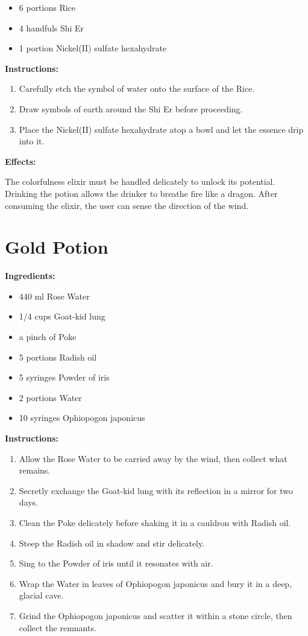 \documentclass{article}
\begin{document}
\begin{itemize}
  \item 6 portions Rice
  \item 4 handfuls Shi Er
  \item 1 portion Nickel(II) sulfate hexahydrate
\end{itemize}

\textbf{Instructions:}

\begin{enumerate}
  \item Carefully etch the symbol of water onto the surface of the Rice.
  \item Draw symbols of earth around the Shi Er before proceeding.
  \item Place the Nickel(II) sulfate hexahydrate atop a bowl and let the essence drip into it.
\end{enumerate}

\textbf{Effects:}

The colorfulness elixir must be handled delicately to unlock its potential. Drinking the potion allows the drinker to breathe fire like a dragon. After consuming the elixir, the user can sense the direction of the wind.

\newpage
\section*{Gold Potion}

\textbf{Ingredients:}

\begin{itemize}
  \item 440 ml Rose Water
  \item 1/4 cups Goat-kid lung
  \item a pinch of Poke
  \item 5 portions Radish oil
  \item 5 syringes Powder of iris
  \item 2 portions Water
  \item 10 syringes Ophiopogon japonicus
\end{itemize}

\textbf{Instructions:}

\begin{enumerate}
  \item Allow the Rose Water to be carried away by the wind, then collect what remains.
  \item Secretly exchange the Goat-kid lung with its reflection in a mirror for two days.
  \item Clean the Poke delicately before shaking it in a cauldron with Radish oil.
  \item Steep the Radish oil in shadow and stir delicately.
  \item Sing to the Powder of iris until it resonates with air.
  \item Wrap the Water in leaves of Ophiopogon japonicus and bury it in a deep, glacial cave.
  \item Grind the Ophiopogon japonicus and scatter it within a stone circle, then collect the remnants.
\end{enumerate}
\end{document}
